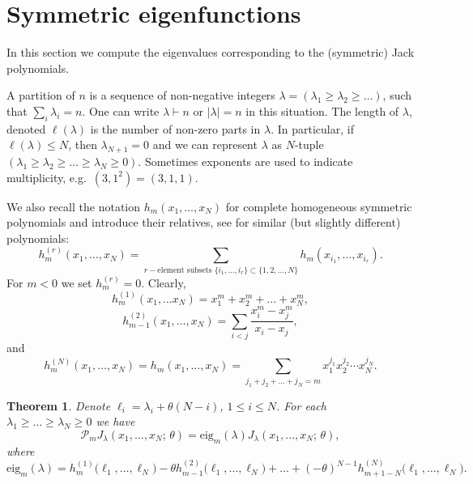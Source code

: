 \documentclass[11pt]{article}
\newtheorem{theorem}[theo]{Theorem}
\theoremstyle{definition}
\numberwithin{equation}{section}
\newcommand{\PP}{\mathcal P}
\begin{document}
\section{Symmetric eigenfunctions}
\label{Section_sym_eigenfunction}

In this section we compute the eigenvalues corresponding to the (symmetric) Jack polynomials.

A partition of $n$ is a sequence of non-negative integers $\lambda=(\lambda_1\ge \lambda_2\ge \dots)$, such that $\sum_{i} \lambda_i=n$. One can write $\lambda\vdash n$ or $|\lambda|=n$ in this situation. The length of $\lambda$, denoted $\ell(\lambda)$ is the number of non-zero parts in $\lambda$. In particular, if $\ell(\lambda)\le N$, then $\lambda_{N+1}=0$ and we can represent $\lambda$ as $N$-tuple $(\lambda_1\ge\lambda_2\ge \dots\ge\lambda_N\ge 0)$. Sometimes exponents are used to indicate multiplicity, e.g.\ $(3,1^2)=(3,1,1)$.

We also recall the notation $h_m(x_1,\dots,x_N)$ for complete homogeneous symmetric polynomials and introduce their relatives, see \cite[Example 19, Section I.2]{macdonald1998symmetric} for similar (but slightly different) polynomials:
\begin{equation}
\label{eq_x3}
 h^{(r)}_m(x_1,\dots,x_N)=\sum_{r-\text{element subsets }\{i_1,\dots,i_r\}\subset\{1,2,\dots,N\}}h_m(x_{i_1},\dots,x_{i_r}).
\end{equation}
For $m<0$ we set $h^{(r)}_m=0$.
Clearly,
$$h^{(1)}_m(x_1,\dots x_N)=x_1^m+x_2^m+\dots+x_N^m,$$
$$h^{(2)}_{m-1}(x_1,\dots,x_N)=\sum_{i<j} \frac{x_i^{m}-x_j^m}{x_i-x_j},$$
and
$$
 h^{(N)}_m(x_1,\dots,x_N)=h_m(x_1,\dots,x_N)=\sum_{j_1+j_2+\dots+j_N=m} x_1^{j_1} x_2^{j_2}\cdots x_N^{j_N}.
$$


\begin{theorem} \label{Theorem_symmetric_ef}
 Denote $\ell_i=\lambda_i+\theta(N-i)$, $1\le i \le N$. For each $\lambda_1\ge \dots\ge \lambda_N\ge 0$ we have
 \begin{equation}
  \PP_m J_\lambda(x_1,\dots,x_N;\, \theta)= \mathrm{eig}_m(\lambda) J_\lambda(x_1,\dots,x_N;\, \theta),
 \end{equation}
 where
 \begin{equation}
 \label{eq_Jack_ev}
  \mathrm{eig}_m(\lambda)=h^{(1)}_m\bigl(\ell_1,\dots,\ell_N\bigr)-\theta h^{(2)}_{m-1}\bigl(\ell_1,\dots,\ell_N\bigr)+\dots+(-\theta)^{N-1}  h^{(N)}_{m+1-N}\bigl(\ell_1,\dots,\ell_N\bigr).
 \end{equation}
\end{theorem}
\end{document}
